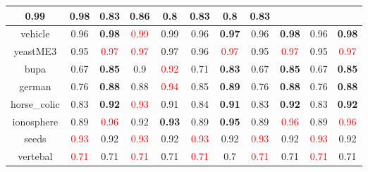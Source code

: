 \documentclass{article}%
\begin{document}
\begin{tabular}{c|cccccccccc}
{0.99
}&0.98&0.83&\textbf{0.86}&0.8&\textbf{0.83}&0.8&\textbf{0.83}\\%
\hline%
vehicle&0.96&\textbf{0.98}&\textcolor{red}{ 
0.99
}&0.99&0.96&\textbf{0.97}&0.96&\textbf{0.98}&0.96&\textbf{0.98}\\%
\hline%
yeastME3&0.95&\textcolor{red}{ 
0.97
}&\textcolor{red}{ 
0.97
}&0.97&0.96&\textcolor{red}{ 
0.97
}&0.95&\textcolor{red}{ 
0.97
}&0.95&\textcolor{red}{ 
0.97
}\\%
\hline%
bupa&0.67&\textbf{0.85}&0.9&\textcolor{red}{ 
0.92
}&0.71&\textbf{0.83}&0.67&\textbf{0.85}&0.67&\textbf{0.85}\\%
\hline%
german&0.76&\textbf{0.88}&0.88&\textcolor{red}{ 
0.94
}&0.85&\textbf{0.89}&0.76&\textbf{0.88}&0.76&\textbf{0.88}\\%
\hline%
horse\_colic&0.83&\textbf{0.92}&\textcolor{red}{ 
0.93
}&0.91&0.84&\textbf{0.91}&0.83&\textbf{0.92}&0.83&\textbf{0.92}\\%
\hline%
ionosphere&0.89&\textcolor{red}{ 
0.96
}&0.92&\textbf{0.93}&0.89&\textbf{0.95}&0.89&\textcolor{red}{ 
0.96
}&0.89&\textcolor{red}{ 
0.96
}\\%
\hline%
seeds&\textcolor{red}{ 
0.93
}&0.92&\textcolor{red}{ 
0.93
}&0.92&\textcolor{red}{ 
0.93
}&0.92&\textcolor{red}{ 
0.93
}&0.92&\textcolor{red}{ 
0.93
}&0.92\\%
\hline%
vertebal&\textcolor{red}{ 
0.71
}&0.71&\textcolor{red}{ 
0.71
}&0.71&\textcolor{red}{ 
0.71
}&0.7&\textcolor{red}{ 
0.71
}&0.71&\textcolor{red}{ 
0.71
}&0.71\\%
\hline%
\end{tabular}

%
\end{document}
